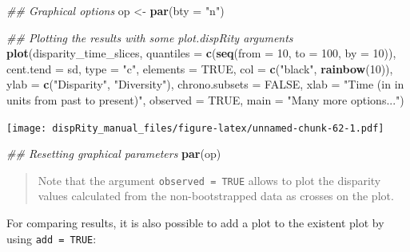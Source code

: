 \documentclass[]{book}
\newenvironment{Shaded}{\begin{snugshade}}{\end{snugshade}}
\newcommand{\CommentTok}[1]{\textcolor[rgb]{0.56,0.35,0.01}{\textit{#1}}}
\newcommand{\DataTypeTok}[1]{\textcolor[rgb]{0.13,0.29,0.53}{#1}}
\newcommand{\DecValTok}[1]{\textcolor[rgb]{0.00,0.00,0.81}{#1}}
\newcommand{\KeywordTok}[1]{\textcolor[rgb]{0.13,0.29,0.53}{\textbf{#1}}}
\newcommand{\NormalTok}[1]{#1}
\newcommand{\OtherTok}[1]{\textcolor[rgb]{0.56,0.35,0.01}{#1}}
\newcommand{\StringTok}[1]{\textcolor[rgb]{0.31,0.60,0.02}{#1}}
\begin{document}
\begin{Shaded}
\begin{Highlighting}[]
\CommentTok{## Graphical options}
\NormalTok{op <-}\StringTok{ }\KeywordTok{par}\NormalTok{(}\DataTypeTok{bty =} \StringTok{"n"}\NormalTok{)}

\CommentTok{## Plotting the results with some plot.dispRity arguments}
\KeywordTok{plot}\NormalTok{(disparity_time_slices,}
    \DataTypeTok{quantiles =} \KeywordTok{c}\NormalTok{(}\KeywordTok{seq}\NormalTok{(}\DataTypeTok{from =} \DecValTok{10}\NormalTok{, }\DataTypeTok{to =} \DecValTok{100}\NormalTok{, }\DataTypeTok{by =} \DecValTok{10}\NormalTok{)),}
    \DataTypeTok{cent.tend =}\NormalTok{ sd, }\DataTypeTok{type =} \StringTok{"c"}\NormalTok{, }\DataTypeTok{elements =} \OtherTok{TRUE}\NormalTok{,}
    \DataTypeTok{col =} \KeywordTok{c}\NormalTok{(}\StringTok{"black"}\NormalTok{, }\KeywordTok{rainbow}\NormalTok{(}\DecValTok{10}\NormalTok{)),}
    \DataTypeTok{ylab =} \KeywordTok{c}\NormalTok{(}\StringTok{"Disparity"}\NormalTok{, }\StringTok{"Diversity"}\NormalTok{), }\DataTypeTok{chrono.subsets =} \OtherTok{FALSE}\NormalTok{,}
    \DataTypeTok{xlab =} \StringTok{"Time (in in units from past to present)"}\NormalTok{,}
    \DataTypeTok{observed =} \OtherTok{TRUE}\NormalTok{,}
    \DataTypeTok{main =} \StringTok{"Many more options..."}\NormalTok{)}
\end{Highlighting}
\end{Shaded}

\texttt{[image: dispRity\_manual\_files/figure-latex/unnamed-chunk-62-1.pdf]}

\begin{Shaded}
\begin{Highlighting}[]
\CommentTok{## Resetting graphical parameters}
\KeywordTok{par}\NormalTok{(op)}
\end{Highlighting}
\end{Shaded}

\begin{quote}
Note that the argument \texttt{observed\ =\ TRUE} allows to plot the disparity values calculated from the non-bootstrapped data as crosses on the plot.
\end{quote}

For comparing results, it is also possible to add a plot to the existent plot by using \texttt{add\ =\ TRUE}:
\end{document}

